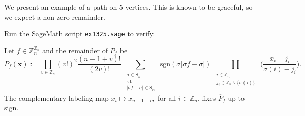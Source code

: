 \begin{example} We present an example of a path on 5 vertices. This is known to be graceful, so we expect a non-zero remainder.
\ \\
\begin{center}   
\end{center}
Run the SageMath script \texttt{ex1325.sage} to verify.
\end{example}
\begin{proposition}\label{prop:complementary-labeling-Symmetry}
Let $f\in\mathbb{Z}_{n}^{\mathbb{Z}_{n}}$ and the remainder of $P_f$ be
\begin{equation}
\overline{P}_{f}(\mathbf{x}):=\prod_{v\in\mathbb{Z}_{n}}(v!)^{2}\frac{(n-1+v)!}{(2v)!}\sum_{\begin{array}{c}
\substack{\sigma\in\text{S}_{n}\\
\text{s.t.}\\
\left|\sigma f-\sigma\right|\in\text{S}_{n}
}
\end{array}}\text{sgn}(\sigma\left|\sigma f-\sigma\right|)\prod_{\begin{array}{c}
\substack{i\in\mathbb{Z}_{n}\\
j_{i}\in\mathbb{Z}_{n}\backslash\{\sigma(i)\}
}
\end{array}}\big(\frac{x_{i}-j_{i}}{\sigma(i)-j_{i}}\big).
\end{equation}
The complementary labeling map $x_{i}\mapsto x_{n-1-i},$ for all $i\in \mathbb{Z}_n$,
fixes $\overline{P}_f$ up to sign.
\end{proposition}
